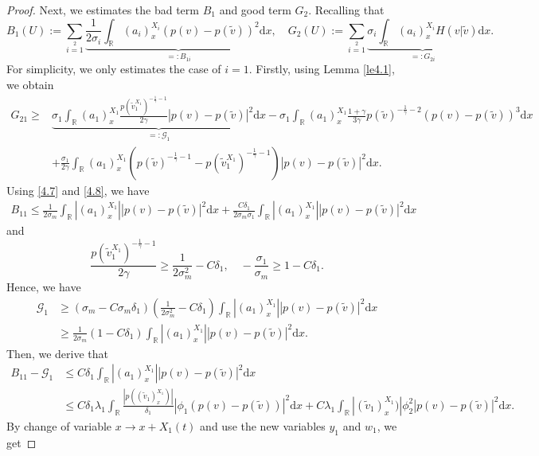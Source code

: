 \documentclass[10pt,reqno]{amsart}
\numberwithin{equation}{section}
\newcommand{\dif}{\mathrm{d}}
\begin{document}
\begin{proof}
Next, we estimates the bad term $B_1$ and good term $G_2$. Recalling that
\[
B_1(U):=\sum\limits_{i=1}\limits^2
   \underbrace{\frac{1}{2\sigma_i}\int_\mathbb{R}(a_i)_{x}^{X_i}(p(v)-p(\widetilde{v}))^2\dif x}_{=:B_{1i}},\quad
G_2(U):=\sum\limits_{i=1}\limits^2\underbrace{\sigma_i\int_\mathbb{R}(a_i)^{X_i}_{x}H(v|\widetilde{v})}
_{=:G_{2i}}\dif x.
\]
For simplicity, we only estimates the case of $i=1$. Firstly, using Lemma \ref{le4.1}, we obtain
\begin{align*}
G_{21}\geq&\underbrace{\sigma_1 \int_\mathbb{R}(a_1)^{X_1}_x\frac{p(\widetilde{v}_1^{X_1})^{-\frac{1}{\gamma}-1}}{2\gamma}
|p(v)-p(\widetilde{v})|^2\dif x}_{=:\mathcal{G}_1}
-\sigma_1 \int_\mathbb{R}(a_1)^{X_1}_x\frac{1+\gamma}{3\gamma}p(\widetilde{v})^{-\frac{1}{\gamma}-2}
(p(v)-p(\widetilde{v}))^3\dif x\\
&+\frac{\sigma_1}{2\gamma}\int_\mathbb{R}(a_1)^{X_1}_x\left(p(\widetilde{v})^{-\frac{1}{\gamma}-1}-p(\widetilde{v}_1^{X_1})^{-\frac{1}{\gamma}-1}\right)
|p(v)-p(\widetilde{v})|^2\dif x.
\end{align*}
Using \eqref{4.7} and \eqref{4.8}, we have
\begin{align*}
B_{11}\le \frac{1}{2\sigma_m}\int_\mathbb{R}|(a_1)^{X_1}_x||p(v)-p(\widetilde{v})|^2\dif x
+\frac{C\delta_1}{2\sigma_m \sigma_1}\int_\mathbb{R}|(a_1)^{X_1}_x||p(v)-p(\widetilde{v})|^2\dif x
\end{align*}
and
\[
\frac{p(\widetilde{v}_1^{X_1})^{-\frac{1}{\gamma}-1}}{2\gamma}\ge \frac{1}{2\sigma_m^2}-C\delta_1,
\quad -\frac{\sigma_1}{\sigma_m}\ge 1-C\delta_1.
\]
Hence, we have
\[
\begin{aligned}
\mathcal{G}_1&\ge (\sigma_m-C \sigma_m\delta_1) \left(\frac{1}{2\sigma_m^2}-C\delta_1\right) \int_\mathbb{R}|(a_1)^{X_1}_x|
|p(v)-p(\widetilde{v})|^2\dif x\\
&\ge\frac{1}{2\sigma_m}(1-C\delta_1)\int_\mathbb{R}|(a_1)^{X_1}_x||p(v)-p(\widetilde{v})|^2\dif x.
\end{aligned}
\]
Then, we derive that
\begin{align*}
B_{11}-\mathcal{G}_1&\le C\delta_1\int_\mathbb{R}|(a_1)^{X_1}_x||p(v)-p(\widetilde{v})|^2\dif x\\
&\le C\delta_1\lambda_1\int_\mathbb{R}\frac{|p((\widetilde{v}_1)^{X_1}_x)|}{\delta_1}|\phi_1(p(v)-p(\widetilde{v}))|^2\dif x
+C\lambda_1\int_\mathbb{R}|(\widetilde{v}_1)^{X_1}_x)|\phi_2^2|p(v)-p(\widetilde{v})|^2\dif x.
\end{align*}
By change of variable $x\rightarrow x+X_1(t)$ and  use the new variables  $y_1$ and $w_1$, we get

\end{proof}
\end{document}
